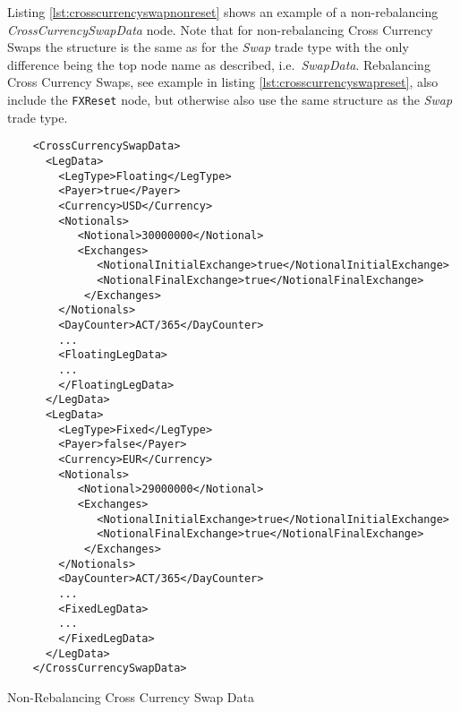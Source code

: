 Listing \ref{lst:crosscurrencyswapnonreset} shows an example of a non-rebalancing \emph{CrossCurrencySwapData} node. Note that for non-rebalancing Cross Currency Swaps the structure is the same as for the \emph{Swap} trade type with the only difference being the top node name as described, i.e.\ \emph{SwapData}. Rebalancing Cross Currency Swaps, see example in listing \ref{lst:crosscurrencyswapreset}, also include the \lstinline!FXReset! node, but otherwise also use the same structure as the \emph{Swap} trade type.

\begin{listing}[H]
\begin{verbatim}
    <CrossCurrencySwapData>
      <LegData>
        <LegType>Floating</LegType>
        <Payer>true</Payer>
        <Currency>USD</Currency>
        <Notionals>
           <Notional>30000000</Notional>
           <Exchanges>
              <NotionalInitialExchange>true</NotionalInitialExchange>
              <NotionalFinalExchange>true</NotionalFinalExchange>
            </Exchanges>
        </Notionals>
        <DayCounter>ACT/365</DayCounter>
        ...
        <FloatingLegData>
        ...
        </FloatingLegData>
      </LegData>
      <LegData>
        <LegType>Fixed</LegType>
        <Payer>false</Payer>
        <Currency>EUR</Currency>
        <Notionals>
           <Notional>29000000</Notional>
           <Exchanges>
              <NotionalInitialExchange>true</NotionalInitialExchange>
              <NotionalFinalExchange>true</NotionalFinalExchange>
            </Exchanges>
        </Notionals>        
        <DayCounter>ACT/365</DayCounter>
        ...
        <FixedLegData>
        ...
        </FixedLegData>
      </LegData>
    </CrossCurrencySwapData>
\end{verbatim}
\caption{Non-Rebalancing Cross Currency Swap Data}
\label{lst:crosscurrencyswapnonreset}
\end{listing}

